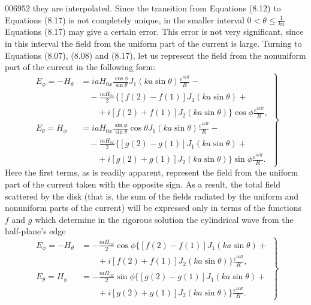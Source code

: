 \begin{scanpage}{0069}{52}
they are interpolated. Since the transition from Equations (8.12) to Equations (8.17) is not completely unique, in the smaller interval $0<\theta\leq\frac1{ka}$ Equations (8.17) may give a certain error. This error is not very significant, since in this interval the field from the uniform part of the current is large.
Turning to Equations (8.07), (8.08) and (8.17), let us represent the field from the nonuniform part of the current in the following form:
\[\left.\begin{aligned}E_\phi=-H_\theta&=iaH_{0x}\frac{\cos\phi}{\sin\theta}J_1(ka\sin\theta)\frac{e^{ikR}}R-\\&\quad-\frac{iaH_{0x}}2\{[f(2)-f(1)]J_1(ka\sin\theta)+\\&\qquad+i[f(2)+f(1)]J_2(ka\sin\theta)\}\cos\phi\frac{e^{ikR}}R,\\E_\theta=H_\phi&=iaH_{0x}\frac{\sin\phi}{\sin\theta}\cos\theta J_1(ka\sin\theta)\frac{e^{ikR}}R-\\&\quad-\frac{iaH_{0x}}2\{[g(2)-g(1)]J_1(ka\sin\theta)+\\&\qquad+i[g(2)+g(1)]J_2(ka\sin\theta)\}\sin\phi\frac{e^{ikR}}R.\end{aligned}\right\}\tag{9.01}\]
Here the first terms, as is readily apparent, represent the field from the uniform part of the current taken with the opposite sign. As a result, the total field scattered by the disk (that is, the sum of the fields radiated by the uniform and nonuniform parts of the current) will be expressed only in terms of the functions $f$ and $g$ which determine in the rigorous solution the cylindrical wave from the half-plane's edge
\[\left.\begin{aligned}E_\phi=-H_\theta&=-\frac{iaH_{0x}}2\cos\phi\{[f(2)-f(1)]J_1(ka\sin\theta)+\\&\qquad+i[f(2)+f(1)]J_2(ka\sin\theta)\}\frac{e^{ikR}}R,\\E_\theta=H_\phi&=-\frac{iaH_{0x}}2\sin\phi\{[g(2)-g(1)]J_1(ka\sin\theta)+\\&\qquad+i[g(2)+g(1)]J_2(ka\sin\theta)\}\frac{e^{ikR}}R.\end{aligned}\right\}\tag{9.02}\]
\end{scanpage}
